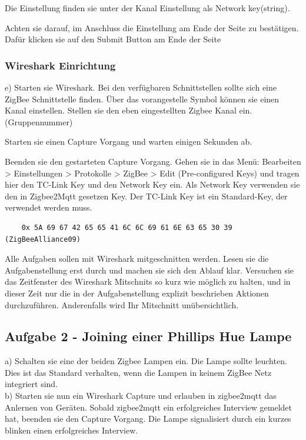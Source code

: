 Die Einstellung finden sie unter der Kanal Einstellung als \grqq Network key(string)\grqq{}.

Achten sie darauf, im Anschluss die Einstellung am Ende der Seite zu bestätigen. Dafür klicken sie auf den 
\grqq Submit \grqq{} Button am Ende der Seite

\subsubsection{Wireshark Einrichtung}

e) Starten sie Wireshark. Bei den verfügbaren Schnittstellen sollte sich eine ZigBee Schnittstelle finden. Über das vorangestelle Symbol können sie einen Kanal einstellen.
Stellen sie den eben eingestellten Zigbee Kanal ein. (Gruppennummer)

Starten sie einen Capture Vorgang und warten einigen Sekunden ab.

Beenden sie den gestarteten Capture Vorgang. Gehen sie in das Menü: Bearbeiten > Einstellungen > Protokolle > ZigBee > Edit (Pre-configured Keys) und tragen
hier den \grqq TC-Link Key\grqq{} und den \grqq Network Key\grqq{} ein. Als \grqq Network Key\grqq{} verwenden sie den in Zigbee2Mqtt gesetzen Key. Der \grqq TC-Link Key\grqq{} ist ein
Standard-Key, der verwendet werden muss.
\begin{lstlisting}
    0x 5A 69 67 42 65 65 41 6C 6C 69 61 6E 63 65 30 39 (ZigBeeAlliance09)
\end{lstlisting}

\begin{Hinweis}
    Alle Aufgaben sollen mit Wireshark mitgeschnitten werden. Lesen sie die Aufgabenstellung erst durch und machen sie sich den Ablauf klar. Versuchen sie das 
    Zeitfenster des Wireshark Mitschnits so kurz wie möglich zu halten, und in dieser Zeit nur die in der Aufgabenstellung explizit beschrieben Aktionen durchzuführen.
    Anderenfalls wird Ihr Mitschnitt unübersichtlich.
\end{Hinweis}

\subsection{Aufgabe 2 - Joining einer Phillips Hue Lampe}
a) Schalten sie eine der beiden Zigbee Lampen ein. Die Lampe sollte leuchten. Dies ist das Standard verhalten, wenn die Lampen in keinem ZigBee Netz integriert sind.\\
b) Starten sie nun ein Wireshark Capture und erlauben in zigbee2mqtt das Anlernen von Geräten. Sobald zigbee2mqtt ein erfolgreiches Interview gemeldet hat, beenden sie
den Capture Vorgang. Die Lampe signalisiert durch ein kurzes blinken einen erfolgreiches Interview.

